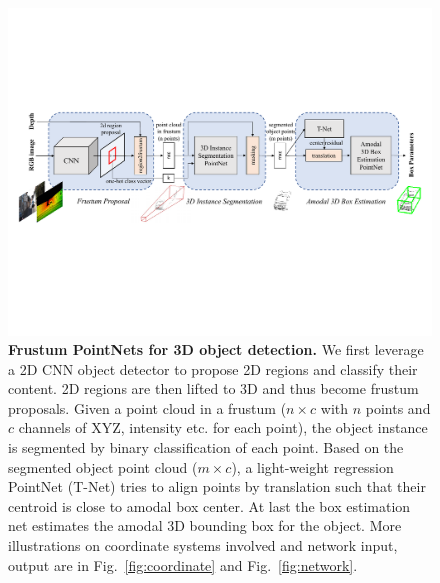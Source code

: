 
\begin{figure}[t!]
    \centering
    \includegraphics[width=0.92\linewidth]{fig/pipeline.pdf}
    \caption{\textbf{Frustum PointNets for 3D object detection.} We first leverage a 2D CNN object detector to propose 2D regions and classify their content. 2D regions are then lifted to 3D and thus become frustum proposals. Given a point cloud in a frustum ($n\times c$ with $n$ points and $c$ channels of XYZ, intensity etc. for each point), the object instance is segmented by binary classification of each point. Based on the segmented object point cloud ($m \times c$), a light-weight regression PointNet (T-Net) tries to align points by translation such that their centroid is close to amodal box center. At last the box estimation net estimates the amodal 3D bounding box for the object. More illustrations on coordinate systems involved and network input, output are in Fig.~\ref{fig:coordinate} and Fig.~\ref{fig:network}.}
    \label{fig:pipeline}
\end{figure}